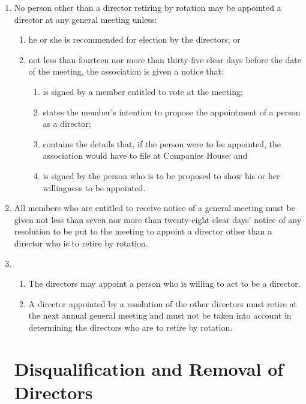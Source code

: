 \begin{enumerate}
\item
  No person other than a director retiring by rotation may be
  appointed a director at any general meeting unless:
  \begin{enumerate}
  \item
    he or she is recommended for election by the directors; or
  \item
    not less than fourteen nor more than thirty-five clear days before
    the date of the meeting, the association is given a notice that:
    \begin{enumerate}
    \item
      is signed by a member entitled to vote at the meeting;
    \item
      states the member's intention to propose the appointment of a
      person as a director;
    \item
      contains the details that, if the person were to be appointed, the
      association would have to file at Companies House; and
    \item
      is signed by the person who is to be proposed to show his or her
      willingness to be appointed.
    \end{enumerate}
  \end{enumerate}
\item
  All members who are entitled to receive notice of a general meeting
  must be given not less than seven nor more than twenty-eight clear
  days' notice of any resolution to be put to the meeting to appoint
  a director other than a director who is to retire by rotation.

\item
  \begin{enumerate}
  \item
    The directors may appoint a person who is willing to act to be a
    director.
  \item
    A director appointed by a resolution of the other directors must
    retire at the next annual general meeting and must not be taken
    into account in determining the directors who are to retire by
    rotation.
  \end{enumerate}

\section{Disqualification and Removal of Directors}


\end{enumerate}
